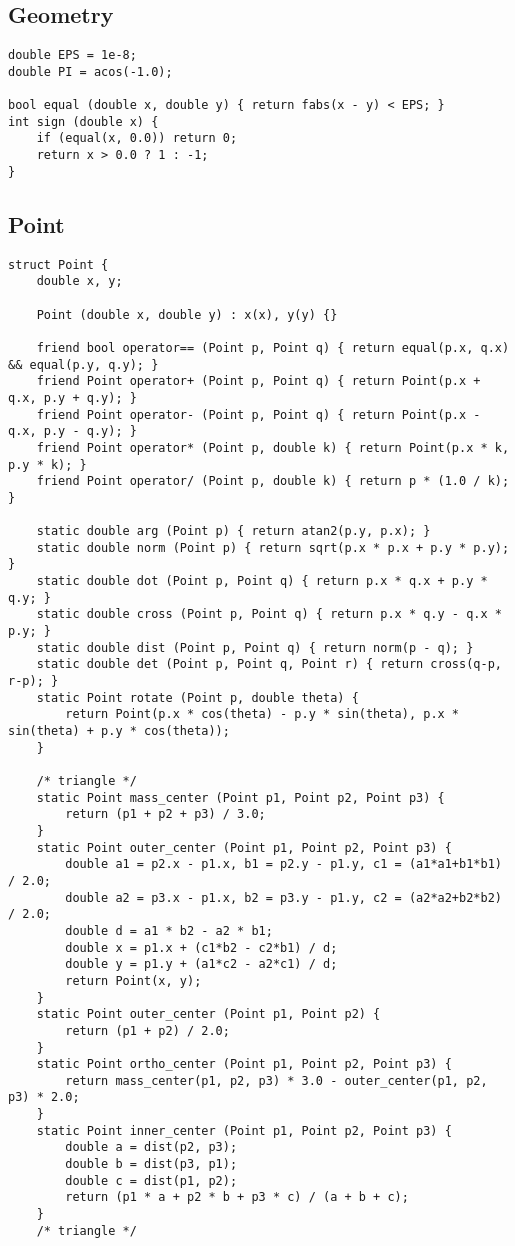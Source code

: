 \documentclass[10pt,landscape]{article}
\begin{document}
\begin{multicols}{2}
\section{Geometry}
\begin{lstlisting}
double EPS = 1e-8;
double PI = acos(-1.0);

bool equal (double x, double y) { return fabs(x - y) < EPS; }
int sign (double x) {
	if (equal(x, 0.0)) return 0;
	return x > 0.0 ? 1 : -1;
}
\end{lstlisting}
\subsection{Point}
\begin{lstlisting}
struct Point {
	double x, y;

	Point (double x, double y) : x(x), y(y) {}

	friend bool operator== (Point p, Point q) { return equal(p.x, q.x) && equal(p.y, q.y); }
	friend Point operator+ (Point p, Point q) { return Point(p.x + q.x, p.y + q.y); }
	friend Point operator- (Point p, Point q) { return Point(p.x - q.x, p.y - q.y); }
	friend Point operator* (Point p, double k) { return Point(p.x * k, p.y * k); }
	friend Point operator/ (Point p, double k) { return p * (1.0 / k); }

	static double arg (Point p) { return atan2(p.y, p.x); }
	static double norm (Point p) { return sqrt(p.x * p.x + p.y * p.y); }
	static double dot (Point p, Point q) { return p.x * q.x + p.y * q.y; }
	static double cross (Point p, Point q) { return p.x * q.y - q.x * p.y; }
	static double dist (Point p, Point q) { return norm(p - q); }
	static double det (Point p, Point q, Point r) { return cross(q-p, r-p); }
	static Point rotate (Point p, double theta) {
		return Point(p.x * cos(theta) - p.y * sin(theta), p.x * sin(theta) + p.y * cos(theta));
	}

	/* triangle */
	static Point mass_center (Point p1, Point p2, Point p3) {
		return (p1 + p2 + p3) / 3.0;
	}
	static Point outer_center (Point p1, Point p2, Point p3) {
		double a1 = p2.x - p1.x, b1 = p2.y - p1.y, c1 = (a1*a1+b1*b1) / 2.0;
		double a2 = p3.x - p1.x, b2 = p3.y - p1.y, c2 = (a2*a2+b2*b2) / 2.0;
		double d = a1 * b2 - a2 * b1;
		double x = p1.x + (c1*b2 - c2*b1) / d;
		double y = p1.y + (a1*c2 - a2*c1) / d;
		return Point(x, y);
	}
	static Point outer_center (Point p1, Point p2) {
		return (p1 + p2) / 2.0;
	}
	static Point ortho_center (Point p1, Point p2, Point p3) {
		return mass_center(p1, p2, p3) * 3.0 - outer_center(p1, p2, p3) * 2.0;
	}
	static Point inner_center (Point p1, Point p2, Point p3) {
		double a = dist(p2, p3);
		double b = dist(p3, p1);
		double c = dist(p1, p2);
		return (p1 * a + p2 * b + p3 * c) / (a + b + c);
	}
	/* triangle */


\end{lstlisting}
\end{multicols}
\end{document}
